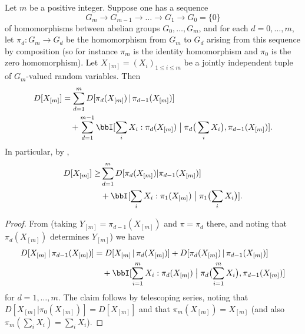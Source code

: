   \begin{lemma}\label{multidist-chain-rule-iter}\leanok  Let $m$ be a positive integer.
    Suppose one has a sequence
    \begin{equation}\label{g-seq}
      G_m \to G_{m-1} \to \dots \to G_1 \to G_0 = \{0\}
    \end{equation}
    of homomorphisms between abelian groups $G_0,\dots,G_m$, and for each $d=0,\dots,m$, let $\pi_d : G_m \to G_d$ be the homomorphism from $G_m$ to $G_d$ arising from this sequence by composition (so for instance $\pi_m$ is the identity homomorphism and $\pi_0$ is the zero homomorphism).
    Let $X_{[m]} = (X_i)_{1 \leq i \leq m}$ be a jointly independent tuple of $G_m$-valued random variables.
    Then
    \begin{equation}
      \begin{split}
        D[ X_{[m]} ] &=  \sum_{d=1}^m D[ \pi_d(X_{[m]}) \,|\, \pi_{d-1}(X_{[m]})] \\
         &\quad + \sum_{d=1}^{m-1} \bbI[ \sum_i X_i : \pi_d(X_{[m]}) \; \big| \; \pi_d\big(\sum_i X_i\big), \pi_{d-1}(X_{[m]}) ].
      \end{split}\label{chain-eq-cond'}
    \end{equation}
    In particular, by ,
    \begin{align}\nonumber
        D[ X_{[m]} ] \geq  & \sum_{d=1}^m D[ \pi_d(X_{[m]})|\pi_{d-1}(X_{[m]}) ] \\
         & + \bbI[ \sum_i X_i : \pi_1(X_{[m]}) \; \big| \; \pi_1\bigl(\sum_i X_i\bigr) ].\label{chain-eq-cond''}
    \end{align}
  \end{lemma}

  \begin{proof}\leanok
  From  (taking $Y_{[m]} = \pi_{d-1}(X_{[m]})$ and $\pi = \pi_d$ there, and noting that $\pi_d(X_{[m]})$ determines $Y_{[m]}$) we have
  \begin{align*}
    D[ X_{[m]} \,|\, \pi_{d-1}(X_{[m]}) ] &=  D[ X_{[m]} \,|\, \pi_d(X_{[m]}) ] + D[  \pi_d(X_{[m]})\,|\,\pi_{d-1}(X_{[m]}) ] \\
                                             &\quad + \bbI[ \sum_{i=1}^m X_i : \pi_d(X_{[m]}) \; \big| \; \pi_d\bigl(\sum_{i=1}^m X_i\bigr), \pi_{d-1}(X_{[m]}) ]
  \end{align*}
  for $d=1,\dots,m$. The claim follows by telescoping series, noting that $D[X_{[m]} | \pi_0(X_{[m]})] = D[X_{[m]}]$ and that $\pi_m(X_{[m]})=X_{[m]}$ (and also $\pi_m( \sum_i X_i ) = \sum_i X_i$).
  \end{proof}

